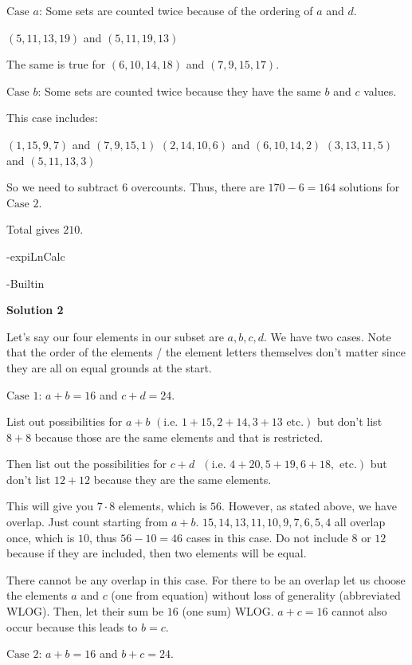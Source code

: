 \begin{enumerate}
 $\textrm{Case } a$: Some sets are counted twice because of the ordering of $a$ and $d$.

 $(5,11,13,19)$ and $(5,11,19,13)$

 The same is true for $(6,10,14,18)$ and $(7,9,15,17)$.

 $\textrm{Case } b$: Some sets are counted twice because they have the same $b$ and $c$ values.

 This case includes:

 $(1,15,9,7)$ and $(7,9,15,1)$
$(2,14,10,6)$ and $(6,10,14,2)$
$(3,13,11,5)$ and $(5,11,13,3)$

 So we need to subtract $6$ overcounts. Thus, there are $170-6=164$ solutions for $\textrm{Case } 2$.

 Total gives $\boxed{210}$.

 -expiLnCalc

 -Builtin

 



\textbf{Solution 2}

Let's say our four elements in our subset are $a,b,c,d$. We have two cases. Note that the order of the elements / the element letters themselves don't matter since they are all on equal grounds at the start.

 
$\textrm{Case } 1 \textrm{:}$ $a+b = 16$ and $c+d = 24$. 

 List out possibilities for $a+b$ $(\text{i.e. } 1+15, 2+14, 3+13 \text{ etc.})$ but don't list $8+8$ because those are the same elements and that is restricted. 

 Then list out the possibilities for $c+d \text{ }(\text{i.e. } 4+20, 5+19, 6+18, \text{ etc.})$ but don't list $12+12$ because they are the same elements. 

 This will give you $7 \cdot 8$ elements, which is $56$. However, as stated above, we have overlap. Just count starting from $a+b$.  $15,14,13,11,10,9,7,6,5,4$ all overlap once, which is $10$, thus $56 - 10 = 46$ cases in this case. Do not include $8$ or $12$ because if they are included, then two elements will be equal.

 There cannot be any overlap in this case. For there to be an overlap let us choose the elements $a$ and $c$ (one from equation) without loss of generality (abbreviated WLOG). Then, let their sum be $16$ (one sum) WLOG. $a+c=16$ cannot also occur because this leads to $b=c$.

 


 $\textrm{Case } 2 \textrm{:}$ $a+b = 16$ and $b+c = 24$. 


\end{enumerate}
